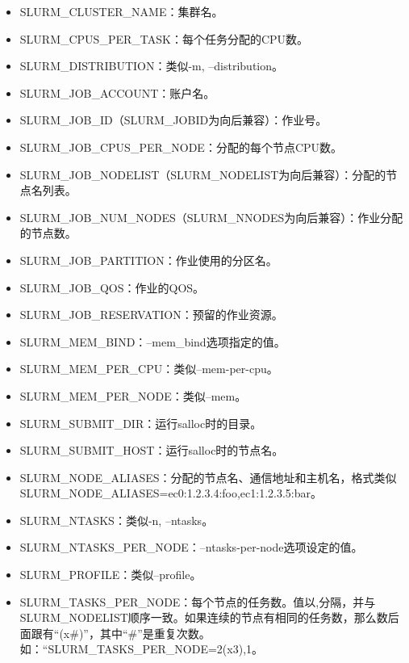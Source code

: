 \begin{itemize}
	\item SLURM\_CLUSTER\_NAME：集群名。
	\item SLURM\_CPUS\_PER\_TASK：每个任务分配的CPU数。
	\item SLURM\_DISTRIBUTION：类似-m, --distribution。
	\item SLURM\_JOB\_ACCOUNT：账户名。
	\item SLURM\_JOB\_ID（SLURM\_JOBID为向后兼容）：作业号。
	\item SLURM\_JOB\_CPUS\_PER\_NODE：分配的每个节点CPU数。
	\item SLURM\_JOB\_NODELIST（SLURM\_NODELIST为向后兼容）：分配的节点名列表。
	\item SLURM\_JOB\_NUM\_NODES（SLURM\_NNODES为向后兼容）：作业分配的节点数。
	\item SLURM\_JOB\_PARTITION：作业使用的分区名。
	\item SLURM\_JOB\_QOS：作业的QOS。
	\item SLURM\_JOB\_RESERVATION：预留的作业资源。
	\item SLURM\_MEM\_BIND：--mem\_bind选项指定的值。
	\item SLURM\_MEM\_PER\_CPU：类似--mem-per-cpu。
	\item SLURM\_MEM\_PER\_NODE：类似--mem。
	\item SLURM\_SUBMIT\_DIR：运行salloc时的目录。
	\item SLURM\_SUBMIT\_HOST：运行salloc时的节点名。
	\item SLURM\_NODE\_ALIASES：分配的节点名、通信地址和主机名，格式类似\\SLURM\_NODE\_ALIASES=ec0:1.2.3.4:foo,ec1:1.2.3.5:bar。
	\item SLURM\_NTASKS：类似-n, --ntasks。
	\item SLURM\_NTASKS\_PER\_NODE：--ntasks-per-node选项设定的值。
	\item SLURM\_PROFILE：类似--profile。
	\item SLURM\_TASKS\_PER\_NODE：每个节点的任务数。值以,分隔，并与SLURM\_NODELIST顺序一致。如果连续的节点有相同的任务数，那么数后面跟有``(x\#)''，其中``\#''是重复次数。如：``SLURM\_TASKS\_PER\_NODE=2(x3),1。
\end{itemize}

